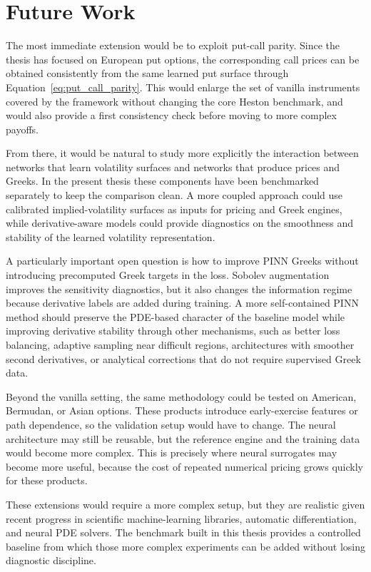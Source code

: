 \section{Future Work}

The most immediate extension would be to exploit put-call parity. Since the thesis has focused on European put options, the corresponding call prices can be obtained consistently from the same learned put surface through Equation~\eqref{eq:put_call_parity}. This would enlarge the set of vanilla instruments covered by the framework without changing the core Heston benchmark, and would also provide a first consistency check before moving to more complex payoffs.

From there, it would be natural to study more explicitly the interaction between networks that learn volatility surfaces and networks that produce prices and Greeks. In the present thesis these components have been benchmarked separately to keep the comparison clean. A more coupled approach could use calibrated implied-volatility surfaces as inputs for pricing and Greek engines, while derivative-aware models could provide diagnostics on the smoothness and stability of the learned volatility representation.

A particularly important open question is how to improve PINN Greeks without introducing precomputed Greek targets in the loss. Sobolev augmentation improves the sensitivity diagnostics, but it also changes the information regime because derivative labels are added during training. A more self-contained PINN method should preserve the PDE-based character of the baseline model while improving derivative stability through other mechanisms, such as better loss balancing, adaptive sampling near difficult regions, architectures with smoother second derivatives, or analytical corrections that do not require supervised Greek data.

Beyond the vanilla setting, the same methodology could be tested on American, Bermudan, or Asian options. These products introduce early-exercise features or path dependence, so the validation setup would have to change. The neural architecture may still be reusable, but the reference engine and the training data would become more complex. This is precisely where neural surrogates may become more useful, because the cost of repeated numerical pricing grows quickly for these products.

These extensions would require a more complex setup, but they are realistic given recent progress in scientific machine-learning libraries, automatic differentiation, and neural PDE solvers. The benchmark built in this thesis provides a controlled baseline from which those more complex experiments can be added without losing diagnostic discipline.
